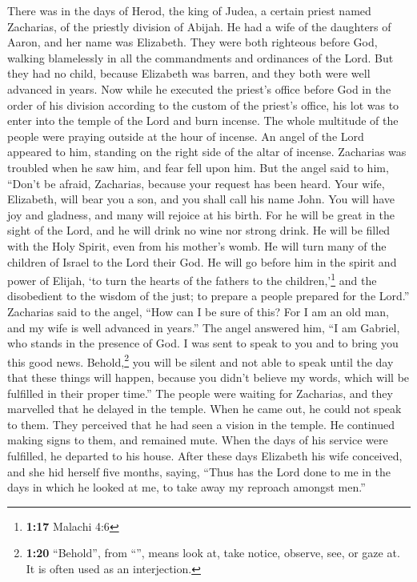  There was in the days of Herod, the king of Judea, a
certain priest named Zacharias, of the priestly division of Abijah. He
had a wife of the daughters of Aaron, and her name was Elizabeth.
 They were both righteous before God, walking blamelessly
in all the commandments and ordinances of the Lord.  But
they had no child, because Elizabeth was barren, and they both were well
advanced in years.  Now while he executed the priest's
office before God in the order of his division  according
to the custom of the priest's office, his lot was to enter into the
temple of the Lord and burn incense.  The whole multitude
of the people were praying outside at the hour of incense.
 An angel of the Lord appeared to him, standing on the
right side of the altar of incense.  Zacharias was
troubled when he saw him, and fear fell upon him.  But
the angel said to him, ``Don't be afraid, Zacharias, because your
request has been heard. Your wife, Elizabeth, will bear you a son, and
you shall call his name John.  You will have joy and
gladness, and many will rejoice at his birth.  For he
will be great in the sight of the Lord, and he will drink no wine nor
strong drink. He will be filled with the Holy Spirit, even from his
mother's womb.  He will turn many of the children of
Israel to the Lord their God.  He will go before him in
the spirit and power of Elijah, `to turn the hearts of the fathers to
the children,'\footnote{\textbf{1:17} Malachi 4:6} and the disobedient
to the wisdom of the just; to prepare a people prepared for the Lord.''
 Zacharias said to the angel, ``How can I be sure of
this? For I am an old man, and my wife is well advanced in years.''
 The angel answered him, ``I am Gabriel, who stands in
the presence of God. I was sent to speak to you and to bring you this
good news.  Behold,\footnote{\textbf{1:20} ``Behold'',
  from ``'', means look at, take notice, observe, see, or
  gaze at. It is often used as an interjection.} you will be silent and
not able to speak until the day that these things will happen, because
you didn't believe my words, which will be fulfilled in their proper
time.''  The people were waiting for Zacharias, and they
marvelled that he delayed in the temple.  When he came
out, he could not speak to them. They perceived that he had seen a
vision in the temple. He continued making signs to them, and remained
mute.  When the days of his service were fulfilled, he
departed to his house.  After these days Elizabeth his
wife conceived, and she hid herself five months, saying, 
``Thus has the Lord done to me in the days in which he looked at me, to
take away my reproach amongst men.''

